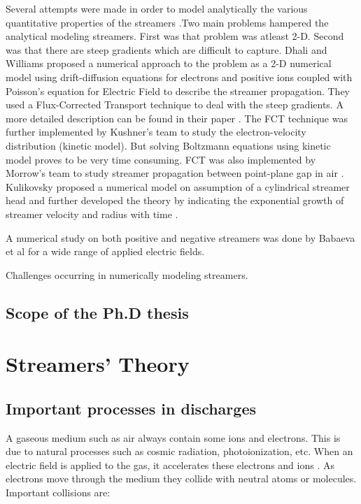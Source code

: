Several attempts were made in order to model analytically the various quantitative properties of the streamers \cite{Davies, Davies, Evans, 1971}.Two main problems hampered the analytical modeling streamers. First was that problem was atleast 2-D. Second was that there are steep gradients which are difficult to capture. Dhali and Williams proposed a numerical approach to the problem as a 2-D numerical model using drift-diffusion equations for electrons and positive ions coupled with Poisson's equation for Electric Field to describe the streamer propagation. They used a Flux-Corrected Transport technique to deal with the steep gradients. A more detailed description can be found in their paper \cite{Dhalli 1987}. The FCT technique was further implemented by Kushner's team \cite{Kushner et al 1989} to study the electron-velocity distribution (kinetic model). But solving Boltzmann equations using kinetic model proves to be very time consuming. FCT was also implemented by Morrow's team to study streamer propagation between point-plane gap in air \cite{Morrow et al, 1997}. Kulikovsky proposed a numerical model on assumption of a cylindrical streamer head \cite{Kulikovsky 1994} and further developed the theory by indicating the exponential growth of streamer velocity and radius with time \cite{KuliKovsky 1997}. 



A numerical study on both positive and negative streamers was done by Babaeva et al \cite{Babaeva et al 1997} for a wide range of applied electric fields.     




Challenges occurring in numerically modeling streamers.


\section{Scope of the Ph.D thesis}




\chapter{Streamers' Theory}

\section{Important processes in discharges}
A gaseous medium such as air always contain some ions and electrons. This is due to natural processes such as cosmic radiation, photoionization, etc. When an electric field is applied to the gas, it accelerates these electrons and ions . As electrons move through the medium they collide with neutral atoms or molecules. Important collisions are:


